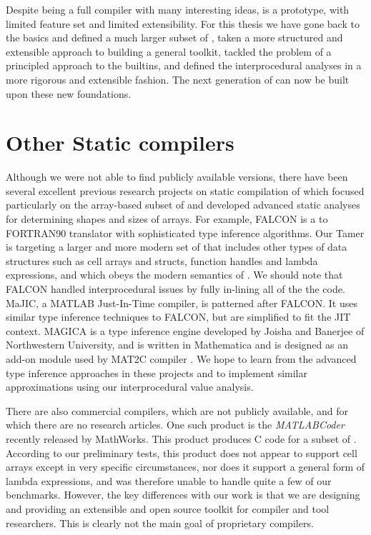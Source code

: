 Despite being a full compiler with many interesting ideas, \mcfor is a
prototype, with limited feature set and limited extensibility. For
this thesis we have gone back to the basics and defined a much larger
subset of \matlab, taken a more structured and extensible approach to
building a general toolkit, tackled the problem of a principled
approach to the builtins, and defined the interprocedural analyses in
a more rigorous and extensible fashion.  The next generation of \mcfor
can now be built upon these new foundations.

\section{Other Static \matlab compilers}

Although we were not able to find publicly available versions, there
have been several excellent previous research projects on static
compilation of \matlab which focused particularly on the array-based
subset of \matlab and developed advanced static analyses for
determining shapes and sizes of arrays.  For example,
FALCON \cite{falcon} is a \matlab to {\sc FORTRAN90} translator with
sophisticated type inference algorithms.  Our Tamer is targeting a
larger and more modern set of \matlab that includes other types of
data structures such as cell arrays and structs, function handles and
lambda expressions, and which obeys the modern semantics of .
We should note that FALCON handled interprocedural issues by fully
in-lining all of the the code.  MaJIC\cite{MaJIC}, a MATLAB
Just-In-Time compiler, is patterned after FALCON.  It uses similar
type inference techniques to FALCON, but are simplified to fit the JIT
context.  MAGICA \cite{Joisha03,MAGICA} is a type inference engine
developed by Joisha and Banerjee of Northwestern University, and is
written in Mathematica and is designed as an add-on module used by
MAT2C compiler \cite{MAT2C}.  We hope to learn from the advanced type
inference approaches in these projects and to implement similar
approximations using our interprocedural value analysis.

There are also commercial compilers, which are not publicly available, and for
which there are no research articles.   One such product is the \textit{MATLABCoder} 
recently released by MathWorks\cite{MATLABCoder}.   This product
produces C code for a subset of \matlab.  According to our preliminary tests,
this product does not appear to support cell arrays except in very
specific circumstances, nor does it support a general form of lambda
expressions, and was therefore unable to handle quite a few of our benchmarks.  
However, the key differences with our work is that we are
designing and providing an extensible and open source toolkit for compiler and
tool researchers.   This is clearly not the main goal of proprietary compilers.

